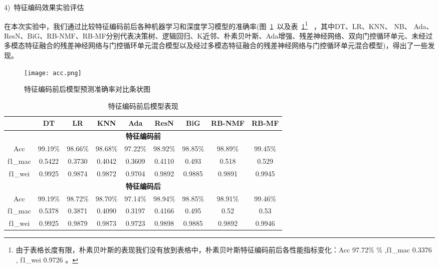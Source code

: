 4)~特征编码效果实验评估\par
在本次实验中，我们通过比较特征编码前后各种机器学习和深度学习模型的准确率(图~\ref{fig:comapre_accuracy_encoding}~以及表~\ref{tab:model_performance}\footnote{由于表格长度有限，朴素贝叶斯的表现我们没有放到表格中，朴素贝叶斯特征编码前后各性能指标变化：Acc 97.72\% \% ,f1\_mac 0.3376 , f1\_wei 0.9726 。}
~，其中DT、LR、KNN、 NB、 Ada、ResN、BiG、RB-NMF、RB-MF分别代表决策树、逻辑回归、K近邻、朴素贝叶斯、Ada增强、残差神经网络、双向门控循环单元、未经过多模态特征融合的残差神经网络与门控循环单元混合模型以及经过多模态特征融合的残差神经网络与门控循环单元混合模型)，得出了一些发现。
\begin{figure}[htbp]
	\centering
	\texttt{[image: acc.png]}
	\caption{特征编码前后模型预测准确率对比条状图}
	\label{fig:comapre_accuracy_encoding}
\end{figure}
\begin{table}[htbp]
	\centering
	\caption{特征编码前后模型表现}
	\label{tab:model_performance}
	\begin{tabular}{ccccccccc}
		\toprule
		        & DT               & LR              & KNN             & Ada               & ResN            & BiG           & RB-NMF          & RB-MF           \\
		\midrule
		\multicolumn{9}{c}{\textbf{特征编码前}}                                                                                                                       \\
		Acc     & 99.19\%          & 98.66\%         & 98.68\%         & 97.22\%           & 98.92\%         & 98.85\%       & 98.89\%         & 99.45\%         \\
		f1\_mac & 0.5422           & 0.3730          & 0.4042          & 0.3609            & 0.4110          & 0.493         & 0.518           & 0.529           \\
		f1\_wei & 0.9925           & 0.9874          & 0.9872          & 0.9704            & 0.9892          & 0.9885        & 0.9891          & 0.9945          \\
		\midrule
		\multicolumn{9}{c}{\textbf{特征编码后}}                                                                                                                       \\
		Acc     & 99.19\%          & 98.72\%\uparrow & 98.70\%\uparrow & 97.14\%\downarrow & 98.94\%\uparrow & 98.85\%       & 98.91\%\uparrow & 99.46\%\uparrow \\
		f1\_mac & 0.5378\downarrow & 0.3871\uparrow  & 0.4090\uparrow  & 0.3197\downarrow  & 0.4166\uparrow  & 0.495\uparrow & 0.52\uparrow    & 0.53\uparrow    \\
		f1\_wei & 0.9925           & 0.9879\uparrow  & 0.9873\uparrow  & 0.9723\uparrow    & 0.9898\uparrow  & 0.9885        & 0.9892\uparrow  & 0.9946\uparrow  \\
		\bottomrule
	\end{tabular}
\end{table}
